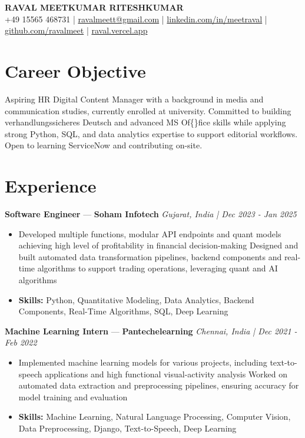 \documentclass[a4paper,10pt]{article}
\begin{document}
\begin{center}
  {\Large\bfseries RAVAL MEETKUMAR RITESHKUMAR}\\[2pt]
  {\small +49 15565 468731 \;|\; \href{mailto:ravalmeett@gmail.com}{ravalmeett@gmail.com} \;|\; \href{https://www.linkedin.com/in/meetraval/}{linkedin.com/in/meetraval} \;|\; \href{https://github.com/ravalmeet}{github.com/ravalmeet} \;|\; \href{https://raval.vercel.app/}{raval.vercel.app}}
\end{center}
\vspace{-3pt}

\section*{Career Objective}
Aspiring HR Digital Content Manager with a background in media and communication studies, currently enrolled at university. Committed to building verhandlungssicheres Deutsch and advanced MS Of\{\}fice skills while applying strong Python, SQL, and data analytics expertise to support editorial workflows. Open to learning ServiceNow and contributing on-site.\par

\section*{Experience}
\textbf{Software Engineer} — \textbf{Soham Infotech} \hfill \textit{Gujarat, India \;|\; Dec 2023 - Jan 2025}\par
\vspace{1pt}
\begin{itemize}
  \item Developed multiple functions, modular API endpoints and quant models achieving high level of profitability in financial decision-making Designed and built automated data transformation pipelines, backend components and real-time algorithms to support trading operations, leveraging quant and AI algorithms
  \item \textbf{Skills:} Python, Quantitative Modeling, Data Analytics, Backend Components, Real-Time Algorithms, SQL, Deep Learning
\end{itemize}
\vspace{3pt}
\textbf{Machine Learning Intern} — \textbf{Pantechelearning} \hfill \textit{Chennai, India \;|\; Dec 2021 - Feb 2022}\par
\vspace{1pt}
\begin{itemize}
  \item Implemented machine learning models for various projects, including text-to-speech applications and high functional visual-activity analysis Worked on automated data extraction and preprocessing pipelines, ensuring accuracy for model training and evaluation
  \item \textbf{Skills:} Machine Learning, Natural Language Processing, Computer Vision, Data Preprocessing, Django, Text-to-Speech, Deep Learning
\end{itemize}
\end{document}

